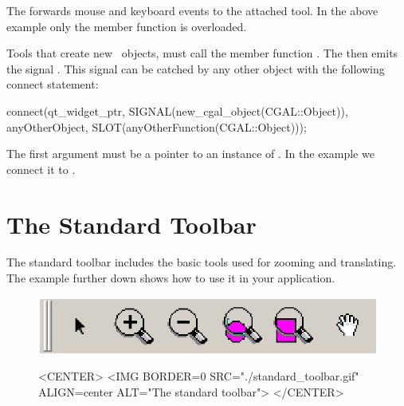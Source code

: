 The  forwards mouse and keyboard events to the attached tool.
In the above example only the  member function is overloaded.

Tools that create new \cgal\ objects, must call the member 
function . The  
then emits the signal . This signal can be 
catched by any other object with the following connect statement:


\begin{ccExampleCode}
connect(qt_widget_ptr, SIGNAL(new_cgal_object(CGAL::Object)), 
        anyOtherObject, SLOT(anyOtherFunction(CGAL::Object)));
\end{ccExampleCode}

The first argument must be a pointer to an instance of .
In the example we connect it to .

\section{The Standard Toolbar}
\label{Qt_widget_standard_toolbar}

The standard toolbar includes the basic tools used for zooming and
translating.  The example further down shows how to use it in your
application.

\begin{figure}
\begin{ccTexOnly}
\begin{center}
\includegraphics{standard_toolbar.eps} 
\end{center}
\end{ccTexOnly}
\begin{ccHtmlOnly}
<CENTER>
<IMG BORDER=0 SRC="./standard_toolbar.gif"  ALIGN=center  ALT="The
standard toolbar">
</CENTER>
\end{ccHtmlOnly}
\end{figure}

